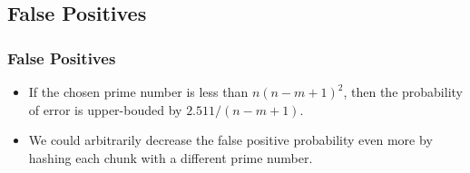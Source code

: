 \subsection{False Positives}
\begin{frame}
	\frametitle{False Positives}
	\begin{itemize}
		\setlength\itemsep{1em}
		\item If the chosen prime number is less than 
		$n(n-m+1)^2$, then the probability of error is
		upper-bouded by $2.511 / (n-m+1)$.
		\item We could arbitrarily decrease the false
		positive probability even more by hashing each chunk
		with a different prime number.
	\end{itemize}
\end{frame}


